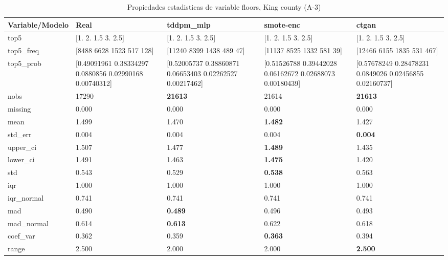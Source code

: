 \begin{table}[H]
\centering
\fontsize{8}{14}\selectfont
\caption{Propiedades  estadisticas de variable floors, King county (A-3)}
\label{table-stats-king county-a-3-floors}
\begin{tabular}{|l|m{10em}|m{10em}|m{10em}|m{10em}|}
\hline
 \rowcolor[gray]{0.8}
Variable/Modelo & Real & tddpm\_mlp & smote-enc & ctgan \\
\hline top5 & [1.  2.  1.5 3.  2.5] & [1.  2.  1.5 3.  2.5] & [1.  2.  1.5 3.  2.5] & [1.  2.  1.5 3.  2.5] \\
\hline top5\_freq & [8488 6628 1523  517  128] & [11240  8399  1438   489    47] & [11137  8525  1332   581    39] & [12466  6155  1835   531   467] \\
\hline top5\_prob & [0.49091961 0.38334297 0.0880856  0.02990168 0.00740312] & [0.52005737 0.38860871 0.06653403 0.02262527 0.00217462] & [0.51526788 0.39442028 0.06162672 0.02688073 0.00180439] & [0.57678249 0.28478231 0.0849026  0.02456855 0.02160737] \\
\hline nobs & 17290 & \bfseries 21613 & \cellcolor[rgb]{0.9, 0.54, 0.52} 21614 & \bfseries 21613 \\
\hline missing & 0.000 & 0.000 & 0.000 & 0.000 \\
\hline mean & 1.499 & 1.470 & \bfseries 1.482 & \cellcolor[rgb]{0.9, 0.54, 0.52} 1.427 \\
\hline std\_err & 0.004 & \cellcolor[rgb]{0.9, 0.54, 0.52} 0.004 & 0.004 & \bfseries 0.004 \\
\hline upper\_ci & 1.507 & 1.477 & \bfseries 1.489 & \cellcolor[rgb]{0.9, 0.54, 0.52} 1.435 \\
\hline lower\_ci & 1.491 & 1.463 & \bfseries 1.475 & \cellcolor[rgb]{0.9, 0.54, 0.52} 1.420 \\
\hline std & 0.543 & 0.529 & \bfseries 0.538 & \cellcolor[rgb]{0.9, 0.54, 0.52} 0.563 \\
\hline iqr & 1.000 & 1.000 & 1.000 & 1.000 \\
\hline iqr\_normal & 0.741 & 0.741 & 0.741 & 0.741 \\
\hline mad & 0.490 & \bfseries 0.489 & \cellcolor[rgb]{0.9, 0.54, 0.52} 0.496 & 0.493 \\
\hline mad\_normal & 0.614 & \bfseries 0.613 & \cellcolor[rgb]{0.9, 0.54, 0.52} 0.622 & 0.618 \\
\hline coef\_var & 0.362 & 0.359 & \bfseries 0.363 & \cellcolor[rgb]{0.9, 0.54, 0.52} 0.394 \\
\hline range & 2.500 & \cellcolor[rgb]{0.9, 0.54, 0.52} 2.000 & \cellcolor[rgb]{0.9, 0.54, 0.52} 2.000 & \bfseries 2.500 \\

\end{tabular}
\end{table}
